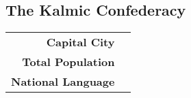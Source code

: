 \subsection{The Kalmic Confederacy}
\begin{tabular}{r | l}
    \textbf{Capital City} & \\
    \textbf{Total Population} & \\
    \textbf{National Language}
\end{tabular}